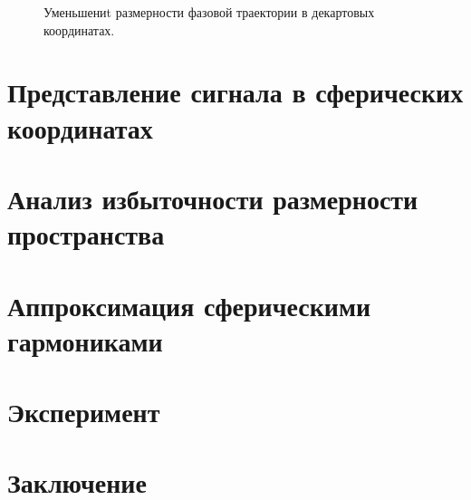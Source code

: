 \documentclass[12pt,twoside]{article}
\begin{document}
\begin{figure}[h]
\caption{Уменьшениt размерности фазовой траектории в декартовых координатах. }
\label{fg:new_traj_1}
\end{figure}

\section{Представление сигнала в сферических координатах}
\section{Анализ избыточности размерности пространства}
\section{Аппроксимация сферическими гармониками}
\section{Эксперимент}
\section{Заключение}
\newpage


\end{document}
